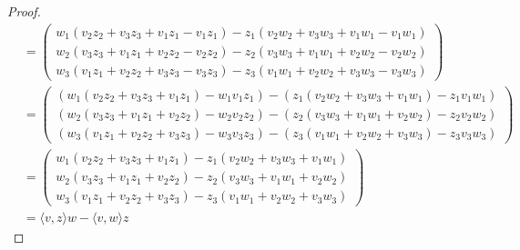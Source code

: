 \documentclass{article}
\begin{document}
\begin{proof}
\[\begin{aligned}
        &=
        \begin{pmatrix}
            w_1(v_2  z_2 + v_3  z_3 + v_1  z_1 - v_1  z_1) - z_1(v_2 w_2  + v_3 w_3 + v_1  w_1 - v_1  w_1)  \\
            w_2(v_3  z_3 + v_1  z_1 + v_2  z_2 - v_2  z_2) - z_2(v_3 w_3  + v_1 w_1 + v_2  w_2 - v_2  w_2)  \\
            w_3(v_1  z_1 + v_2  z_2 + v_3  z_3 - v_3  z_3) - z_3(v_1 w_1  + v_2 w_2 + v_3  w_3 - v_3  w_3) 
        \end{pmatrix}  \\
        &=
        \begin{pmatrix}
            (w_1(v_2  z_2 + v_3  z_3 + v_1  z_1) - w_1 v_1  z_1) - (z_1(v_2 w_2  + v_3 w_3 + v_1  w_1) - z_1 v_1  w_1)  \\
            (w_2(v_3  z_3 + v_1  z_1 + v_2  z_2) - w_2 v_2  z_2) - (z_2(v_3 w_3  + v_1 w_1 + v_2  w_2) - z_2 v_2  w_2)  \\
            (w_3(v_1  z_1 + v_2  z_2 + v_3  z_3) - w_3 v_3  z_3) - (z_3(v_1 w_1  + v_2 w_2 + v_3  w_3) - z_3 v_3  w_3) 
        \end{pmatrix} \\
        &=
        \begin{pmatrix}
            w_1(v_2  z_2 + v_3  z_3 + v_1  z_1) - z_1(v_2 w_2  + v_3 w_3 + v_1  w_1) \\
            w_2(v_3  z_3 + v_1  z_1 + v_2  z_2) - z_2(v_3 w_3  + v_1 w_1 + v_2  w_2) \\
            w_3(v_1  z_1 + v_2  z_2 + v_3  z_3) - z_3(v_1 w_1  + v_2 w_2 + v_3  w_3) 
        \end{pmatrix} \\
        &=
        \langle v, z \rangle w - \langle v, w \rangle z
    \end{aligned}
    \]
    
 \end{proof}
\end{document}
